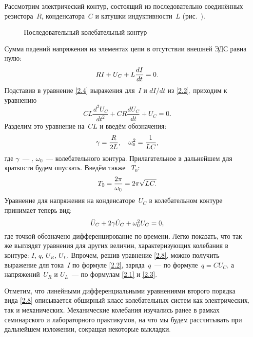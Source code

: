 \label{sec:free}

Рассмотрим электрический контур, состоящий из последовательно соединённых
резистора~$R$, конденсатора~$C$ и катушки индуктивности~$L$
(рис.~).

\begin{figure}[h!]
	\centering
	\caption{Последовательный колебательный контур}
\end{figure}

Сумма падений напряжения на элементах цепи в отсутствии внешней ЭДС равна нулю:
\begin{equation}
	\eqmark{2.4}
	RI+U_C+L\dfrac{dI}{dt}=0.
\end{equation}
Подставив в уравнение \eqref{2.4} выражения для~$I$ и $dI/dt$ из \eqref{2.2},
приходим к уравнению
\begin{equation*}
	CL\dfrac{d^2 U_{C} }{dt^2}+CR\dfrac{dU_C}{dt}+U_C=0.
\end{equation*}
Разделим это уравнение на~$CL$ и введём обозначения:
\begin{equation}\eqmark{2.6}
\gamma=\dfrac{R}{2L},~~~\omega_0^2=\dfrac{1}{LC},
\end{equation}
где $\gamma$~--- ,
$\omega_0$~---  колебательного контура.
Прилагательное   в дальнейшем для краткости будем опускать. 
Введём также  ~$T_0$:
\begin{equation}\eqmark{2.7}
T_0=\dfrac{2\pi}{\omega_0}=2\pi\sqrt{LC.}
\end{equation}
Уравнение для напряжения на конденсаторе~$U_C$ в колебательном контуре 
принимает теперь вид:
\begin{equation}\eqmark{2.8}
\ddot{U}_C+2\gamma\dot{U}_C+\omega_0^2U_C=0,
\end{equation}
где точкой обозначено дифференцирование по времени. Легко показать, что так же
выглядят уравнения для других величин, характеризующих колебания в контуре:
$I$, $q$, $U_R$, $U_L$.
Впрочем, решив уравнение \eqref{2.8}, можно получить выражение для тока~$I$ по
формуле \eqref{2.2}, заряда~$q$~--- по формуле~$q=CU_C$, а напряжений~$U_R$ и
$U_L$~--- по формулам \eqref{2.1} и \eqref{2.3}.

Отметим, что линейными дифференциальными уравнениями второго порядка вида
\eqref{2.8} описывается обширный класс колебательных систем как электрических,
так и механических. Механические колебания изучались ранее в рамках
семинарского и лабораторного практикумов, на что мы будем рассчитывать при
дальнейшем изложении, сокращая некоторые выкладки.

